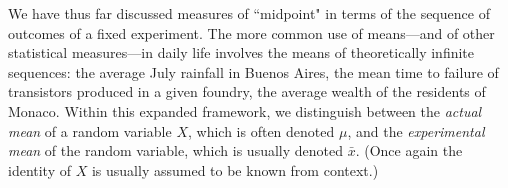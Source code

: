 We have thus far discussed measures of ``midpoint" in terms of the sequence of outcomes of a fixed experiment.  The more common use of means---and of other statistical measures---in daily life involves the means of theoretically infinite sequences: the average July rainfall in Buenos Aires, the mean time to failure of transistors produced in a given foundry, the average wealth of the residents of Monaco.  Within this expanded framework, we distinguish between the {\em actual mean} of a random variable $X$, which is often denoted $\mu$, and the {\em experimental mean} of the random variable, which is usually denoted $\bar{x}$.  (Once again the identity of $X$ is usually assumed to be known from context.)

 

